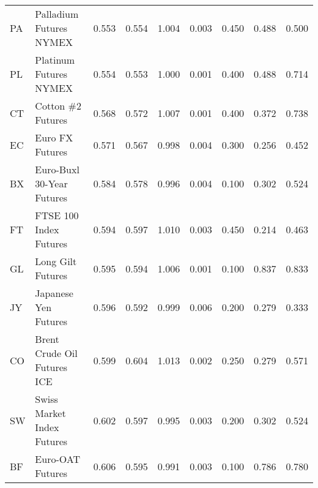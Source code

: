 \begin{longtable}{llrrrrrrr}
  PA &                        \makecell{Palladium Futures\\NYMEX} &        0.553 &       0.554 &     1.004 &        0.003 &           0.450 &                0.488 &      0.500 \\
  PL &                         \makecell{Platinum Futures\\NYMEX} &        0.554 &       0.553 &     1.000 &        0.001 &           0.400 &                0.488 &      0.714 \\
  CT &                                         Cotton \#2 Futures &        0.568 &       0.572 &     1.007 &        0.001 &           0.400 &                0.372 &      0.738 \\
  EC &                                            Euro FX Futures &        0.571 &       0.567 &     0.998 &        0.004 &           0.300 &                0.256 &      0.452 \\
  BX &                      \makecell{Euro-Buxl 30-Year\\Futures} &        0.584 &       0.578 &     0.996 &        0.004 &           0.100 &                0.302 &      0.524 \\
  FT &                         \makecell{FTSE 100 Index\\Futures} &        0.594 &       0.597 &     1.010 &        0.003 &           0.450 &                0.214 &      0.463 \\
  GL &                                          Long Gilt Futures &        0.595 &       0.594 &     1.006 &        0.001 &           0.100 &                0.837 &      0.833 \\
  JY &                                       Japanese Yen Futures &        0.596 &       0.592 &     0.999 &        0.006 &           0.200 &                0.279 &      0.333 \\
  CO &                    \makecell{Brent Crude Oil\\Futures ICE} &        0.599 &       0.604 &     1.013 &        0.002 &           0.250 &                0.279 &      0.571 \\
  SW &                     \makecell{Swiss Market Index\\Futures} &        0.602 &       0.597 &     0.995 &        0.003 &           0.200 &                0.302 &      0.524 \\
  BF &                                           Euro-OAT Futures &        0.606 &       0.595 &     0.991 &        0.003 &           0.100 &                0.786 &      0.780 \\

\end{longtable}
